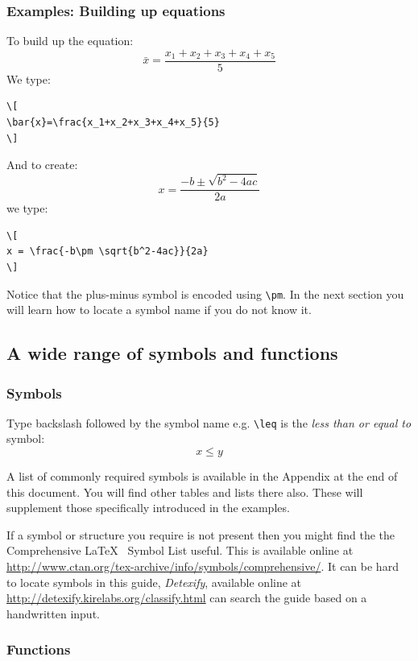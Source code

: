 \documentclass[a4paper,14pt]{extarticle}
\begin{document}
\subsubsection{Examples: Building up equations}

To build up the equation:
\[
\bar{x}=\frac{x_1+x_2+x_3+x_4+x_5}{5}
\]
We type:
\begin{verbatim}
\[
\bar{x}=\frac{x_1+x_2+x_3+x_4+x_5}{5}
\]
\end{verbatim}

And to create:
\[
x = \frac{-b\pm \sqrt{b^2-4ac}}{2a}
\]
we type:
\begin{verbatim}
\[
x = \frac{-b\pm \sqrt{b^2-4ac}}{2a}
\]
\end{verbatim}
Notice that the plus-minus symbol is encoded using \verb=\pm=. In the next section you will learn how to locate a symbol name if you do not know it. 

\subsection{A wide range of symbols and functions}

\subsubsection{Symbols}

Type backslash followed by the symbol name e.g. \verb=\leq= is the \emph{less than or equal to} symbol:
\[
x \leq y
\]

A list of commonly required symbols is available in the Appendix at the end of this document. You will find other tables and lists there also. These will supplement those specifically introduced in the examples. 

If a symbol or structure you require is not present then you might find the the Comprehensive \LaTeX~ Symbol List useful. This is available online at \url{http://www.ctan.org/tex-archive/info/symbols/comprehensive/}. It can be hard to locate symbols in this guide, \emph{Detexify}, available online at \url{http://detexify.kirelabs.org/classify.html} can search the guide based on a handwritten input. 

\subsubsection{Functions}
\end{document}
